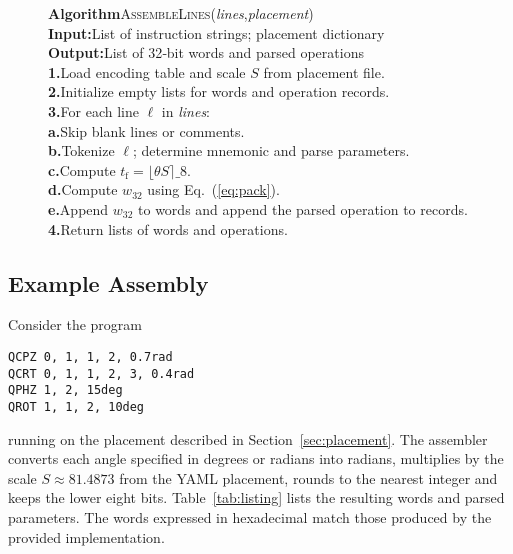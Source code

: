 \documentclass[11pt]{article}
\begin{document}
\begin{figure}[H]
\centering
\begin{minipage}{0.95\linewidth}
\begin{footnotesize}
\begin{tabbing}
\textbf{Algorithm}\quad\=\textsc{AssembleLines}(\textit{lines},\textit{placement})\\
\textbf{Input:}\>List of instruction strings; placement dictionary\\
\textbf{Output:}\>List of 32‑bit words and parsed operations\\
\textbf{1.}\>Load encoding table and scale $S$ from placement file.\\
\textbf{2.}\>Initialize empty lists for words and operation records.\\
\textbf{3.}\>For each line $\ell$ in \textit{lines}:\\
\>\textbf{a.}\>Skip blank lines or comments.\\
\>\textbf{b.}\>Tokenize $\ell$; determine mnemonic and parse
parameters.\\
\>\textbf{c.}\>Compute $t_{\mathrm{f}}=\lfloor \theta S \rceil\_8$.\\
\>\textbf{d.}\>Compute $w_{32}$ using Eq.~(\ref{eq:pack}).\\
\>\textbf{e.}\>Append $w_{32}$ to words and append the parsed
operation to records.\\
\textbf{4.}\>Return lists of words and operations.
\end{tabbing}
\end{footnotesize}
\end{minipage}
\end{figure}

\subsection{Example Assembly}
Consider the program
\begin{verbatim}
QCPZ 0, 1, 1, 2, 0.7rad
QCRT 0, 1, 1, 2, 3, 0.4rad
QPHZ 1, 2, 15deg
QROT 1, 1, 2, 10deg
\end{verbatim}
running on the placement described in Section~\ref{sec:placement}.  The
assembler converts each angle specified in degrees or radians into
radians, multiplies by the scale $S\approx81.4873$ from the YAML
placement, rounds to the nearest integer and keeps the lower eight
bits.  Table~\ref{tab:listing} lists the resulting words and parsed
parameters.  The words expressed in hexadecimal match those produced by
the provided implementation.
\end{document}
